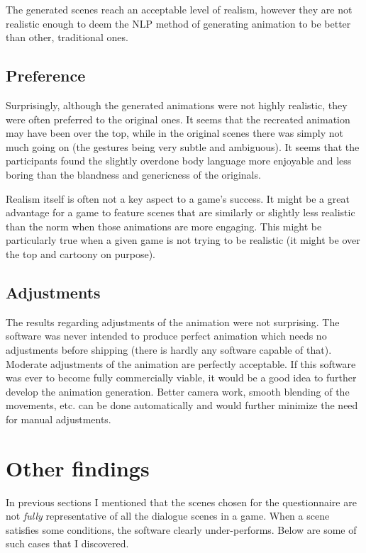 The generated scenes reach an acceptable level of realism, however they are not realistic enough to deem the NLP method of generating animation to be better than other, traditional ones. 

\subsection{Preference}
Surprisingly, although the generated animations were not highly realistic, they were often preferred to the original ones. It seems that the recreated animation may have been over the top, while in the original scenes there was simply not much going on (the gestures being very subtle and ambiguous). It seems that the participants found the slightly overdone body language more enjoyable and less boring than the blandness and genericness of the originals.

Realism itself is often not a key aspect to a game's success. It might be a great advantage for a game to feature scenes that are similarly or slightly less realistic than the norm when those animations are more engaging. This might be particularly true when a given game is not trying to be realistic (it might be over the top and cartoony on purpose).


\subsection{Adjustments}
The results regarding adjustments of the animation were not surprising. The software was never intended to produce perfect animation which needs no adjustments before shipping (there is hardly any software capable of that). Moderate adjustments of the animation are perfectly acceptable. If this software was ever to become fully commercially viable, it would be a good idea to further develop the animation generation. Better camera work, smooth blending of the movements, etc. can be done automatically and would further minimize the need for manual adjustments.


\section{Other findings \label{sec:otherfindings}}
In previous sections I mentioned that the scenes chosen for the questionnaire are not \textit{fully} representative of all the dialogue scenes in a game. When a scene satisfies some conditions, the software clearly under-performs. Below are some of such cases that I discovered.

